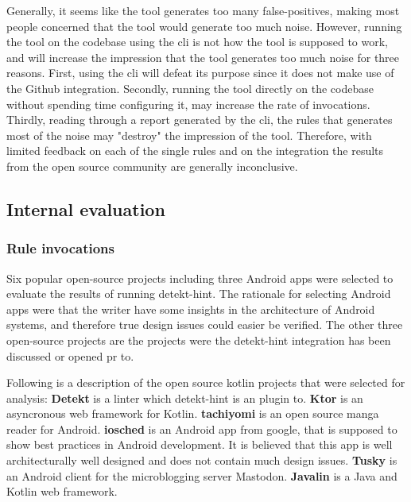 \documentclass{report}
\begin{document}
Generally, it seems like the tool generates too many false-positives, making most people concerned that the tool would generate too much noise. However, running the tool on the codebase using the \gls{cli} is not how the tool is supposed to work, and will increase the impression that the tool generates too much noise for three reasons. First, using the \gls{cli} will defeat its purpose since it does not make use of the Github integration. Secondly, running the tool directly on the codebase without spending time configuring it, may increase the rate of invocations. Thirdly, reading through a report generated by the \gls{cli}, the rules that generates most of the noise may "destroy" the impression of the tool. Therefore, with limited feedback on each of the single rules and on the integration the results from the open source community are generally inconclusive.
 
\subsection{Internal evaluation}
\subsubsection{Rule invocations}
Six popular open-source projects including three Android apps were selected to evaluate the results of running detekt-hint. The rationale for selecting Android apps were that the writer have some insights in the architecture of Android systems, and therefore true design issues could easier be verified. The other three open-source projects are the projects were the detekt-hint integration has been discussed or opened \gls{pr} to. 


Following is a description of the open source kotlin projects that were selected for analysis: \textbf{Detekt} is a linter which detekt-hint is an plugin to. \textbf{Ktor} is an asyncronous web framework for Kotlin. \textbf{tachiyomi} is an open source manga reader for Android. \textbf{iosched} is an Android app from google, that is supposed to show best practices in Android development. It is believed that this app is well architecturally well designed and does not contain much design issues. \textbf{Tusky} is an Android client for the microblogging server Mastodon. \textbf{Javalin} is a Java and Kotlin web framework. 
\end{document}
